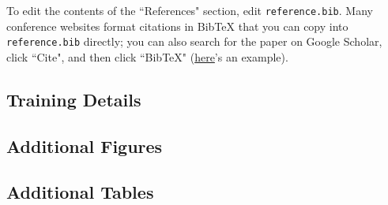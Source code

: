 \documentclass[12pt,letterpaper]{article}
\begin{document}
\makereference

{\color{blue} To edit the contents of the ``References" section, edit \texttt{reference.bib}. Many conference websites format citations in BibTeX that you can copy into \texttt{reference.bib} directly; you can also search for the paper on Google Scholar, click ``Cite", and then click ``BibTeX" (\href{https://scholar.google.com/scholar?hl=en&as_sdt=0%2C23&q=attention+is+all+you+need&btnG=#d=gs_cit&t=1700436667623&u=%2Fscholar%3Fq%3Dinfo%3A5Gohgn6QFikJ%3Ascholar.google.com%2F%26output%3Dcite%26scirp%3D0%26hl%3Den}{here}'s an example).}





\clearpage
\makeappendix

\subsection{Training Details}

\subsection{Additional Figures}

\subsection{Additional Tables}
\end{document}
